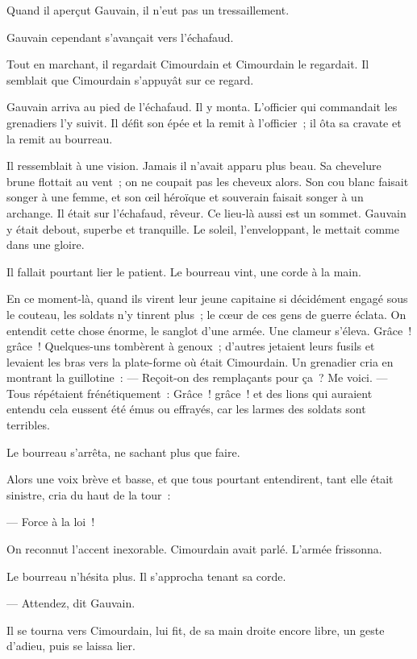 \documentclass[french,twoside]{book} %
\begin{document}
Quand il aperçut Gauvain, il n’eut pas un tressaillement.\par
Gauvain cependant s’avançait vers l’échafaud.\par
Tout en marchant, il regardait Cimourdain et Cimourdain le regardait. Il semblait que Cimourdain s’appuyât sur ce regard.\par
Gauvain arriva au pied de l’échafaud. Il y monta. L’officier qui commandait les grenadiers l’y suivit. Il défit son épée et la remit à l’officier ; il ôta sa cravate et la remit au bourreau.\par
Il ressemblait à une vision. Jamais il n’avait apparu plus beau. Sa chevelure brune flottait au vent ; on ne coupait pas les cheveux alors. Son cou blanc faisait songer à une femme, et son œil héroïque et souverain faisait songer à un archange. Il était sur l’échafaud, rêveur. Ce lieu-là aussi est un sommet. Gauvain y était debout, superbe et tranquille. Le soleil, l’enveloppant, le mettait comme dans une gloire.\par
Il fallait pourtant lier le patient. Le bourreau vint, une corde à la main.\par
En ce moment-là, quand ils virent leur jeune capitaine si décidément engagé sous le couteau, les soldats n’y tinrent plus ; le cœur de ces gens de guerre éclata. On entendit cette chose énorme, le sanglot d’une armée. Une clameur s’éleva. Grâce ! grâce ! Quelques-uns tombèrent à genoux ; d’autres jetaient  leurs fusils et levaient les bras vers la plate-forme où était Cimourdain. Un grenadier cria en montrant la guillotine : — Reçoit-on des remplaçants pour ça ? Me voici. — Tous répétaient frénétiquement : Grâce ! grâce ! et des lions qui auraient entendu cela eussent été émus ou effrayés, car les larmes des soldats sont terribles.\par
Le bourreau s’arrêta, ne sachant plus que faire.\par
Alors une voix brève et basse, et que tous pourtant entendirent, tant elle était sinistre, cria du haut de la tour :\par
— Force à la loi !\par
On reconnut l’accent inexorable. Cimourdain avait parlé. L’armée frissonna.\par
Le bourreau n’hésita plus. Il s’approcha tenant sa corde.\par
— Attendez, dit Gauvain.\par
Il se tourna vers Cimourdain, lui fit, de sa main droite encore libre, un geste d’adieu, puis se laissa lier.\par
\end{document}
